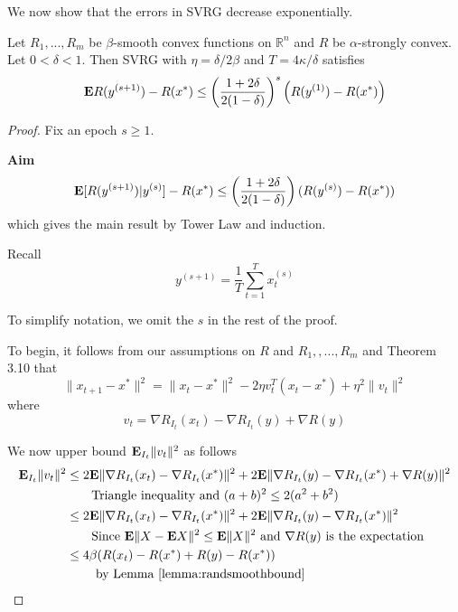 We now show that the errors in SVRG decrease exponentially.

\begin{theorem}
\label{thm:svrg}

Let $R_1, ..., R_m$ be $\beta$-smooth convex functions on $\mathbb{R}^n$ and $R$ be $\alpha$-strongly convex. Let $0< \delta < 1$. Then SVRG with $\eta = \delta/2\beta$ and $T = 4\kappa/\delta$ satisfies
\begin{equation*}
	\mathbf{E} R(y^{(s+1)}) - R(x^*) \le \left(\frac{1+2\delta}{2(1-\delta)}\right)^s \left(R(y^{(1)}) - R(x^*)\right)
\end{equation*}

\begin{proof}
Fix an epoch $s \ge 1$.

\textbf{Aim}
\begin{equation}
	\label{eqn:aim}
	\mathbf{E} [R(y^{(s+1)})|y^{(s)}] - R(x^*) \le \left(\frac{1+2\delta}{2(1-\delta)}\right) (R(y^{(s)}) - R(x^*))
\end{equation}
which gives the main result by Tower Law and induction.

Recall
\begin{equation*}
	y^{(s+1)} = \frac{1}{T}\sum_{t=1}^T x_t^{(s)}
\end{equation*}

To simplify notation, we omit the $s$ in the rest of the proof.

To begin, it follows from our assumptions on $R$ and $R_1, , ..., R_m$ and \cite{bubeck} Theorem 3.10 that
\begin{equation}
	\label{eqn:vbound}
	\|x_{t+1} - x^*\|^2 = \|x_t - x^*\|^2 - 2\eta v_t^T(x_t - x^*) + \eta^2\|v_t\|^2
\end{equation}
where
\begin{equation*}
	v_t = \nabla R_{I_t}(x_t) - \nabla R_{I_t}(y) + \nabla R(y)
\end{equation*}

We now upper bound $\mathbf{E}_{I_t} \|v_t\|^2$ as follows
\begin{align*}
	\mathbf{E}_{I_t} \|v_t\|^2 &\le 2\mathbf{E} \|\nabla R_{I_t}(x_t) - \nabla R_{I_t}(x^*)\|^2 + 2\mathbf{E} \|\nabla R_{I_t}(y) - \nabla R_{I_t}(x^*) + \nabla R(y)\|^2 \\
	& \qquad \text{Triangle inequality and } (a+b)^2 \le 2(a^2 + b^2) \\
	& \le 2\mathbf{E} \|\nabla R_{I_t}(x_t) - \nabla R_{I_t}(x^*)\|^2 + 2\mathbf{E} \|\nabla R_{I_t}(y) - \nabla R_{I_t}(x^*)\|^2 \\
	& \qquad \text{Since } \mathbf{E} \|X - \mathbf{E} X\|^2 \le \mathbf{E} \|X\|^2 \text{ and } \nabla R(y) \text{ is the expectation} \\
	& \le 4\beta(R (x_t) - R(x^*) + R(y) - R(x^*))\\
	& \qquad \text{ by Lemma \ref{lemma:randsmoothbound}}
\end{align*}


\end{proof}
\end{theorem}
